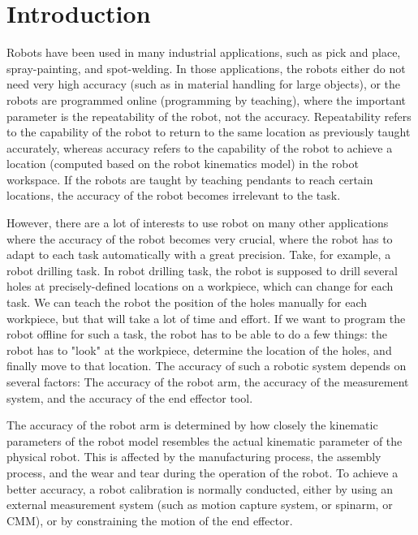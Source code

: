 \section{Introduction}
\label{sec:introduction}

Robots have been used in many industrial applications, such as pick and place, spray-painting, and spot-welding. In those applications, the robots either do not need very high accuracy (such as in material handling for large objects), or the robots are programmed online (programming by teaching), where the important parameter is the repeatability of the robot, not the accuracy. Repeatability refers to the capability of the robot to return to the same location as previously taught accurately, whereas accuracy refers to the capability of the robot to achieve a location (computed based on the robot kinematics model) in the robot workspace. If the robots are taught by teaching pendants to reach certain locations, the accuracy of the robot becomes irrelevant to the task. 

However, there are a lot of interests to use robot on many other applications where the accuracy of the robot becomes very crucial, where the robot has to adapt to each task automatically with a great precision. Take, for example, a robot drilling task. In robot drilling task, the robot is supposed to drill several holes at precisely-defined locations on a workpiece, which can change for each task. We can teach the robot the position of the holes manually for each workpiece, but that will take a lot of time and effort. If we want to program the robot offline for such a task, the robot has to be able to do a few things: the robot has to "look" at the workpiece, determine the location of the holes, and finally
move to that location. The accuracy of such a robotic system depends on several factors: The accuracy of the robot arm, the accuracy of the measurement system, and the accuracy of the end effector tool. 

The accuracy of the robot arm is determined by how closely the kinematic parameters of the robot model resembles the actual kinematic parameter of the physical robot. This is affected by the manufacturing process, the assembly process, and the wear and tear during the operation of the robot. To achieve a better accuracy, a robot calibration is normally conducted, either by using an external measurement system (such as motion capture system, or spinarm, or CMM), or by constraining the motion of the end effector. 

